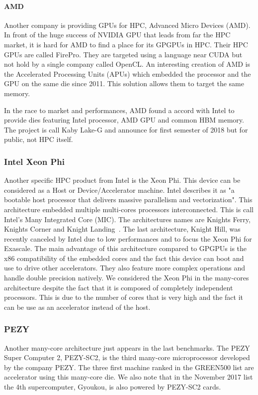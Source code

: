 \paragraph{AMD}
Another company is providing GPUs for HPC, Advanced Micro Devices (AMD). 
In front of the huge success of NVIDIA GPU that leads from far the HPC market, it is hard for AMD to find a place for its GPGPUs in HPC. 
Their HPC GPUs are called FirePro.
They are targeted using a language near CUDA but not hold by a single company called OpenCL. 
An interesting creation of AMD is the Accelerated Processing Units (APUs) which embedded the processor and the GPU on the same die since 2011. 
This solution allows them to target the same memory. 

In the race to market and performances, AMD found a accord with Intel to provide dies featuring Intel processor, AMD GPU and common HBM memory. 
The project is call  Kaby Lake-G and announce for first semester of 2018 but for public, not HPC itself. 

\subsubsection{Intel Xeon Phi}
Another specific HPC product from Intel is the Xeon Phi. 
This device can be considered as a Host or Device/Accelerator machine. 
Intel describes it as "a bootable host processor that delivers massive parallelism and vectorization".
This architecture embedded multiple multi-cores processors interconnected. 
This is call Intel's Many Integrated Core (MIC).
The architectures names are Knights Ferry, Knights Corner and Knight Landing~\cite{sodani2016knights}. 
The last architecture, Knight Hill, was recently canceled by Intel due to low performances and to focus the Xeon Phi for Exascale.
The main advantage of this architecture compared to GPGPUs is the x86 compatibility of the embedded cores and the fact this device can boot and use to drive other accelerators. 
They also feature more complex operations and handle double precision natively.
We considered the Xeon Phi in the many-cores architecture despite the fact that it is composed of completely independent processors. 
This is due to the number of cores that is very high and the fact it can be use as an accelerator instead of the host.  


\subsubsection{PEZY}
Another many-core architecture just appears in the last benchmarks. 
The PEZY Super Computer 2, PEZY-SC2, is the third many-core microprocessor developed by the company PEZY. 
The three first machine ranked in the GREEN500 list are accelerator using this many-core die. 
We also note that in the November 2017 list the 4th supercomputer, Gyoukou, is also powered by PEZY-SC2 cards.


